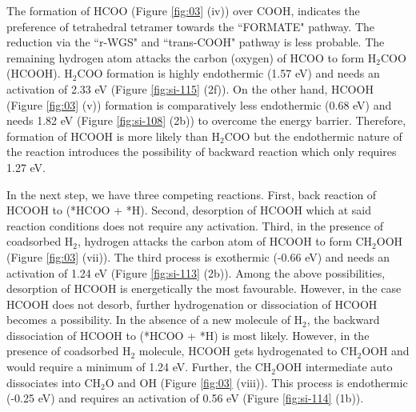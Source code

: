 The formation of HCOO  (Figure \ref{fig:03} (iv)) over COOH, indicates the preference of tetrahedral tetramer towards the ``FORMATE" pathway. The reduction via the ``r-WGS" and ``trans-COOH" pathway is less probable. The remaining hydrogen atom attacks the carbon (oxygen) of HCOO to form H$_2$COO (HCOOH). H$_2$COO formation is highly endothermic (1.57 eV) and needs an activation of 2.33 eV (Figure \ref{fig:si-115} (2f)). On the other hand, HCOOH (Figure \ref{fig:03} (v)) formation is comparatively less endothermic (0.68 eV) and needs 1.82 eV (Figure \ref{fig:si-108} (2b)) to overcome the energy barrier. Therefore, formation of HCOOH is more likely than H$_2$COO but the endothermic nature of the reaction introduces the possibility of backward reaction which only requires 1.27 eV. 

In the next step, we have three competing reactions. First, back reaction of HCOOH to (*HCOO + *H). Second, desorption of HCOOH which at said reaction conditions does not require any activation. Third, in the presence of coadsorbed H$_2$, hydrogen attacks the carbon atom of HCOOH to form CH$_2$OOH (Figure \ref{fig:03} (vii)). The third process is exothermic (-0.66 eV) and needs an activation of 1.24 eV (Figure \ref{fig:si-113} (2b)). Among the above possibilities, desorption of HCOOH is energetically the most favourable. However, in the case HCOOH does not desorb, further hydrogenation or dissociation of HCOOH becomes a possibility. In the absence of a new molecule of H$_2$, the backward dissociation of HCOOH to (*HCOO + *H) is most likely. However, in the presence of coadsorbed H$_2$ molecule, HCOOH gets hydrogenated to CH$_2$OOH and would require a minimum of 1.24 eV. Further, the CH$_2$OOH intermediate auto dissociates into CH$_2$O and OH (Figure \ref{fig:03} (viii)). This process is endothermic (-0.25 eV) and requires an activation of 0.56 eV (Figure \ref{fig:si-114} (1b)). 

